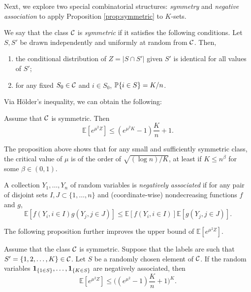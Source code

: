 \documentclass[10pt, oneside]{article}
\begin{document}
Next, we explore two special combinatorial structures: \textit{symmetry} and \textit{negative association} to apply Proposition \ref{prop:symmetric} to $K$-sets.
\begin{defn}[Symmetry]
  \label{defn:symmetry}
  We say that the class ${\mathcal C}$ is {\it symmetric} if it satisfies the following conditions.
  Let $S,S'$ be drawn independently and uniformly at random from ${\mathcal C}$. Then,
  \begin{enumerate}
    \item the conditional distribution of $Z=|S\cap S'|$ given $S'$ is identical
    for all values of $S'$;
    \item for any fixed $S_0\in{\mathcal C}$ and $i\in S_0$, $\mathbb{P}\{i\in S\}=K/n$.
  \end{enumerate}
\end{defn}
Via H\"older's inequality, we can obtain the following:
\begin{prop}
  \label{prop:symmetric}
  Assume that ${\mathcal C}$ is symmetric. Then 
  $$\mathbb{E}[ e^{\mu^2 Z}]\le (e^{\mu^2K} -1 ) \frac{K}{n} +1.$$
\end{prop}
The proposition above shows that for any small and sufficiently symmetric class, the critical value of $\mu$ is of the order of $\sqrt{(\log n)/K}$, at least if $K\le n^\beta$ for some $\beta\in(0,1)$.
\begin{defn}
  A collection $Y_1,\ldots,Y_n$ of random variables is \textit{negatively associated} if for any pair of disjoint sets $I,J\subset\{1,\ldots,n\}$ and (coordinate-wise) nondecreasing functions $f$ and $g$,
\[
\mathbb{E}[ f(Y_i, i\in I) g(Y_j, j\in J) ]
\le\mathbb{E}[ f(Y_i, i\in I) ] \mathbb{E}[g(Y_j, j\in J) ].
\]
\end{defn}
The following proposition further improves the upper bound of $\mathbb{E}[ e^{\mu^2 Z}].$
\begin{prop}
  \label{negass}
  Assume that the class ${\mathcal C}$ is symmetric. Suppose that the labels are such that $S'=\{1,2,\ldots,K\} \in{\mathcal C}$. Let $S$ be a randomly chosen element of ${\mathcal C}$. If the random variables
  ${\bf 1}_{\{ 1 \in S \}},\ldots,{\bf 1}_{\{ K\in S \}}$ are negatively associated, then 
  $$\mathbb{E}[ e^{\mu^2 Z}]\le \biggl( (e^{\mu^2} -1 ) \frac{K}{n} +1 \biggr)^K.$$
\end{prop}
\end{document}
